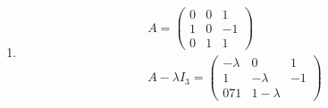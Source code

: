 \begin{enumerate}
\begin{gather}
Q = \begin{pmatrix}
1 & 0 & 2\\
1 & 0 & 4\\
0 & 1 & 3
\end{pmatrix}\\
\begin{gmatrix}[left]
1 & 0 & 2&\\
1 & 0 & 4&\\
0 & 1 & 3&
\end{gmatrix}
\begin{gmatrix}[right]
1 & 0 & 0\\
0 & 1 & 0\\
0 & 0 & 1
\end{gmatrix}
\leadsto
\begin{gmatrix}[left]
1 & 0 & 0&\\
0 & 1 & 0&\\
0 & 0 & 1&
\end{gmatrix}
\begin{gmatrix}[right]
2 & -1  & 0\\
\mfrac{3}{2} & \mfrac{-3}{2} & 1\\
\mfrac{-1}{2} & \mfrac{1}{2} & 0
\end{gmatrix}\\
\implies Q^{-1} = 
\begin{pmatrix}
2 & -1  & 0\\
\mfrac{3}{2} & \mfrac{-3}{2} & 1\\
\mfrac{-1}{2} & \mfrac{1}{2} & 0
\end{pmatrix}\\
D = \begin{pmatrix}
3 & 0 & 0\\
0 & 3 & 0\\
0 & 0 & -1
\end{pmatrix}
\end{gather}
\item 
\begin{gather}
A=
\begin{pmatrix}
0 & 0 & 1\\
1 & 0 & -1\\
0 & 1 & 1
\end{pmatrix}\\
A - \lambda I_3 = \begin{pmatrix}
-\lambda & 0 & 1\\
1 & -\lambda & -1\\
0 7 1 & 1-\lambda
\end{pmatrix}

\end{gather}
\end{enumerate}
